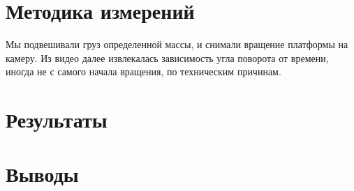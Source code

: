 \documentclass[a4paper, 12pt]{article}
\begin{document}
\section{Методика измерений}
Мы подвешивали груз определенной массы, и снимали вращение платформы на камеру.
Из видео далее извлекалась зависимость угла поворота от времени, иногда не с самого начала вращения, по техническим причинам.

\section{Результаты}
\section{Выводы}
\end{document}
